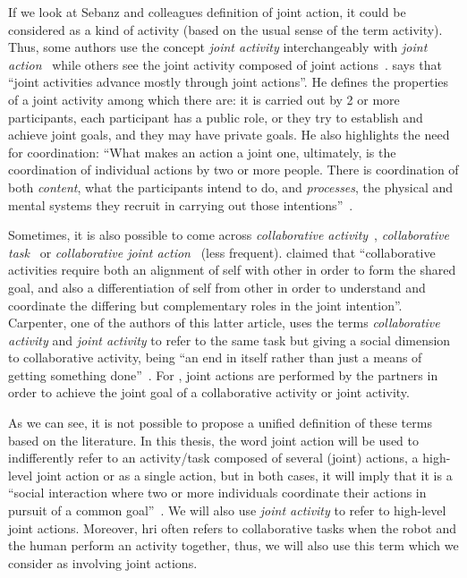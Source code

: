 \documentclass[a4paper,11pt,twoside]{StyleThese}
\begin{document}
If we look at Sebanz and colleagues definition of joint action, it could be considered as a kind of activity (based on the usual sense of the term activity). Thus, some authors use the concept \emph{joint activity} interchangeably with \emph{joint action}~\citep{tollefsen_2005_let,grafenhain_2013_three} while others see the joint activity composed of joint actions~\citep{clark_1996_using, feltovitch_2005_common}. \citet[p~.59]{clark_1996_using} says that ``joint activities advance mostly through joint actions''. He defines the properties of a joint activity among which there are: it is carried out by 2 or more participants, each participant has a public role, or they try to establish and achieve joint goals, and they may have private goals. He also highlights the need for coordination: ``What makes an action a joint one, ultimately, is the coordination of individual actions by two or more people. There is coordination of both \emph{content}, what the participants intend to do, and \emph{processes}, the physical and mental systems they recruit in carrying out those intentions''~\citep[p~.59]{clark_1996_using}. 

Sometimes, it is also possible to come across \emph{collaborative activity}~\citep{tomasello_2005_understanding}, \emph{collaborative task}~\citep{brennan_2008_coordinating} or \emph{collaborative joint action}~\citep{godman_2013_we} (less frequent). \citet[p.~681]{tomasello_2005_understanding} claimed that ``collaborative activities require both an alignment of self with other in order to form the shared goal, and also a differentiation of self from other in order to understand and coordinate the differing but complementary roles in the joint intention''. Carpenter, one of the authors of this latter article, uses the terms \emph{collaborative activity} and \emph{joint activity} to refer to the same task but giving a social dimension to collaborative activity, being ``an end in itself rather than just a means of getting something done''~\citep[p.~384]{carpenter_2009_just}. For \cite{pacherie_2013_intentional}, joint actions are performed by the partners in order to achieve the joint goal of a collaborative activity or joint activity.

As we can see, it is not possible to propose a unified definition of these terms based on the literature. In this thesis, the word joint action will be used to indifferently refer to an activity/task composed of several (joint) actions, \ie a high-level joint action or as a single action, but in both cases, it will imply that it is a ``social interaction where two or more individuals coordinate their actions in pursuit of a common goal''~\citep[p.~7598]{castro_2020_joint}. We will also use \textit{joint activity} to refer to high-level joint actions. Moreover, \acrshort{hri} often refers to collaborative tasks when the robot and the human perform an activity together, thus, we will also use this term which we consider as involving joint actions.
\end{document}
